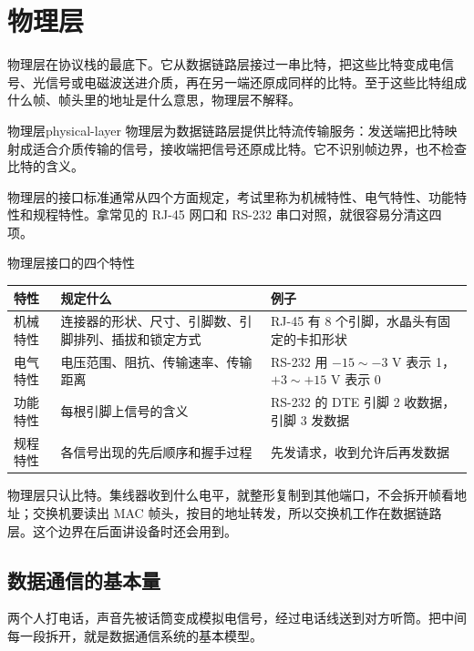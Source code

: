 \section{物理层}

物理层在协议栈的最底下。它从数据链路层接过一串比特，把这些比特变成电信号、光信号或电磁波送进介质，再在另一端还原成同样的比特。至于这些比特组成什么帧、帧头里的地址是什么意思，物理层不解释。

\begin{mydef}{物理层}{physical-layer}
物理层为数据链路层提供比特流传输服务：发送端把比特映射成适合介质传输的信号，接收端把信号还原成比特。它不识别帧边界，也不检查比特的含义。
\end{mydef}

物理层的接口标准通常从四个方面规定，考试里称为机械特性、电气特性、功能特性和规程特性。拿常见的 RJ-45 网口和 RS-232 串口对照，就很容易分清这四项。

\begin{tablebox}{物理层接口的四个特性}
\centering
\small
\begin{tabularx}{\linewidth}{|p{1.9cm}|p{4.5cm}|X|}
\hline
特性 & 规定什么 & 例子 \\
\hline
机械特性 & 连接器的形状、尺寸、引脚数、引脚排列、插拔和锁定方式 & RJ-45 有 8 个引脚，水晶头有固定的卡扣形状 \\
电气特性 & 电压范围、阻抗、传输速率、传输距离 & RS-232 用 $-15\sim-3$ V 表示 1，$+3\sim+15$ V 表示 0 \\
功能特性 & 每根引脚上信号的含义 & RS-232 的 DTE 引脚 2 收数据，引脚 3 发数据 \\
规程特性 & 各信号出现的先后顺序和握手过程 & 先发请求，收到允许后再发数据 \\
\hline
\end{tabularx}
\end{tablebox}

物理层只认比特。集线器收到什么电平，就整形复制到其他端口，不会拆开帧看地址；交换机要读出 MAC 帧头，按目的地址转发，所以交换机工作在数据链路层。这个边界在后面讲设备时还会用到。

\subsection{数据通信的基本量}

两个人打电话，声音先被话筒变成模拟电信号，经过电话线送到对方听筒。把中间每一段拆开，就是数据通信系统的基本模型。

